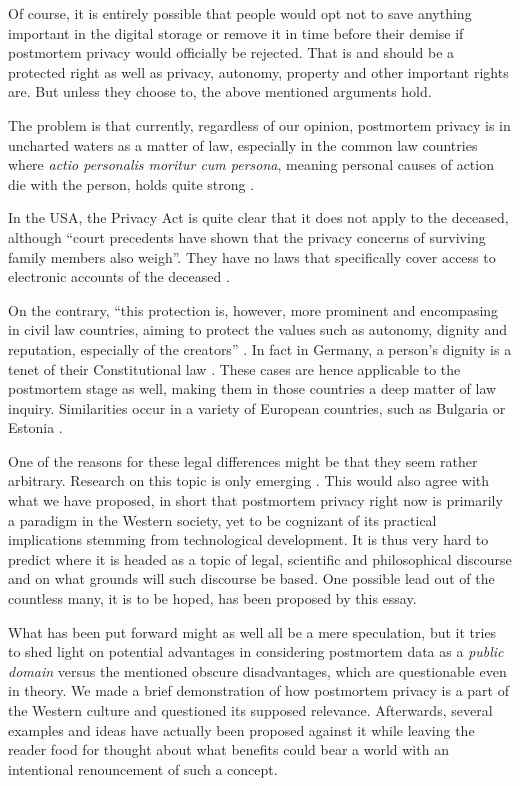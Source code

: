 \documentclass[a4paper]{article}
\begin{document}
Of course, it is entirely possible that people would opt not to save anything important in the digital storage or remove it in time before their demise if postmortem privacy would officially be rejected. That is and should be a protected right as well as privacy, autonomy, property and other important rights are. But unless they choose to, the above mentioned arguments hold.

The problem is that currently, regardless of our opinion, postmortem privacy is in uncharted waters as a matter of law, especially in the common law countries where \textit{actio personalis moritur cum persona}, meaning personal causes of action die with the person, holds quite strong \cite{harbinja2}. 

In the USA, the Privacy Act is quite clear that it does not apply to the deceased, although ``court precedents have shown that the privacy concerns of surviving family members also weigh''. They have no laws that specifically cover access to electronic accounts of the deceased \cite{grabianowski}.

On the contrary, ``this protection is, however, more prominent and encompasing in civil law countries, aiming to protect the values such as autonomy, dignity and reputation, especially of the creators'' \cite{harbinja2}. In fact in Germany, a person's dignity is a tenet of their Constitutional law \cite{buitelaar}. These cases are hence applicable to the postmortem stage as well, making them in those countries a deep matter of law inquiry. Similarities occur in a variety of European countries, such as Bulgaria or Estonia \cite{harbinja}. 

One of the reasons for these legal differences might be that they seem rather arbitrary. Research on this topic is only emerging \cite{harbinja2}. This would also agree with what we have proposed, in short that postmortem privacy right now is primarily a paradigm in the Western society, yet to be cognizant of its practical implications stemming from technological development.
It is thus very hard to predict where it is headed as a topic of legal, scientific and philosophical discourse and on what grounds will such discourse be based. One possible lead out of the countless many, it is to be hoped, has been proposed by this essay.

\medskip
What has been put forward might as well all be a mere speculation, but it tries to shed light on potential advantages in considering postmortem data as a \emph{public domain} versus the mentioned obscure disadvantages, which are questionable even in theory. We made a brief demonstration of how postmortem privacy is a part of the Western culture and questioned its supposed relevance. Afterwards, several examples and ideas have actually been proposed against it while leaving the reader food for thought about what benefits could bear a world with an intentional renouncement of such a concept.
\end{document}
